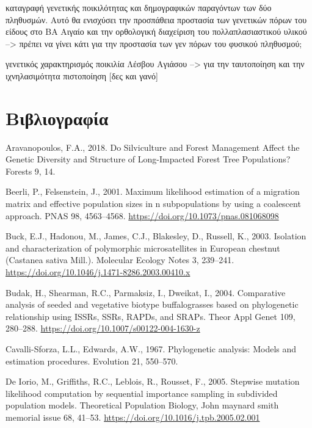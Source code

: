 \documentclass[12pt,a4paper,]{report}
\begin{document}
καταγραφή γενετικής ποικιλότητας και δημογραφικών παραγόντων των δύο
πληθυσμών. Αυτό θα ενισχύσει την προσπάθεια προστασία των γενετικών
πόρων του είδους στο ΒΑ Αιγαίο και την ορθολογική διαχείριση του
πολλαπλασιαστικού υλικού --\textgreater{} πρέπει να γίνει κάτι για την
προστασία των γεν πόρων του φυσικού πληθυσμού;

γενετικός χαρακτηρισμός ποικιλία Λέσβου Αγιάσου --\textgreater{} για την
ταυτοποίηση και την ιχνηλασιμότητα πιστοποίηση {[}δες και γανό{]}

\section{Βιβλιογραφία}

\hypertarget{refs}{}
\leavevmode\hypertarget{ref-Aravanopoulos2018a}{}%
Aravanopoulos, F.A., 2018. Do Silviculture and Forest Management Affect
the Genetic Diversity and Structure of Long-Impacted Forest Tree
Populations? Forests 9, 14.

\leavevmode\hypertarget{ref-beerli_maximum_2001}{}%
Beerli, P., Felsenstein, J., 2001. Maximum likelihood estimation of a
migration matrix and effective population sizes in n subpopulations by
using a coalescent approach. PNAS 98, 4563--4568.
\url{https://doi.org/10.1073/pnas.081068098}

\leavevmode\hypertarget{ref-buck_isolation_2003}{}%
Buck, E.J., Hadonou, M., James, C.J., Blakesley, D., Russell, K., 2003.
Isolation and characterization of polymorphic microsatellites in
European chestnut (Castanea sativa Mill.). Molecular Ecology Notes 3,
239--241. \url{https://doi.org/10.1046/j.1471-8286.2003.00410.x}

\leavevmode\hypertarget{ref-budak_comparative_2004}{}%
Budak, H., Shearman, R.C., Parmaksiz, I., Dweikat, I., 2004. Comparative
analysis of seeded and vegetative biotype buffalograsses based on
phylogenetic relationship using ISSRs, SSRs, RAPDs, and SRAPs. Theor
Appl Genet 109, 280--288.
\url{https://doi.org/10.1007/s00122-004-1630-z}

\leavevmode\hypertarget{ref-cavalli1967phylogenetic}{}%
Cavalli-Sforza, L.L., Edwards, A.W., 1967. Phylogenetic analysis: Models
and estimation procedures. Evolution 21, 550--570.

\leavevmode\hypertarget{ref-de_iorio_stepwise_2005}{}%
De Iorio, M., Griffiths, R.C., Leblois, R., Rousset, F., 2005. Stepwise
mutation likelihood computation by sequential importance sampling in
subdivided population models. Theoretical Population Biology, John
maynard smith memorial issue 68, 41--53.
\url{https://doi.org/10.1016/j.tpb.2005.02.001}
\end{document}
